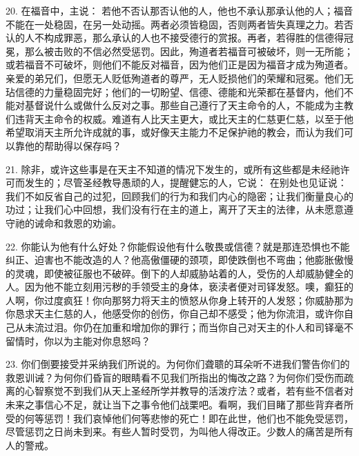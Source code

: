 20. 在福音中，主说：  若他不否认那否认他的人，他也不承认那承认他的人；福音不能在一处稳固，在另一处动摇。两者必须皆稳固，否则两者皆失真理之力。若否认的人不构成罪恶，那么承认的人也不接受德行的赏报。再者，若得胜的信德得冠冕，那么被击败的不信必然受惩罚。因此，殉道者若福音可被破坏，则一无所能；或若福音不可破坏，则他们不能反对福音，因为他们正是因为福音才成为殉道者。亲爱的弟兄们，但愿无人贬低殉道者的尊严，无人贬损他们的荣耀和冠冕。他们无玷信德的力量稳固完好；他们的一切盼望、信德、德能和光荣都在基督内，他们不能对基督说什么或做什么反对之事。那些自己遵行了天主命令的人，不能成为主教们违背天主命令的权威。难道有人比天主更大，或比天主的仁慈更仁慈，以至于他希望取消天主所允许成就的事，或好像天主能力不足保护祂的教会，而认为我们可以靠他的帮助得以保存吗？\par

21. 除非，或许这些事是在天主不知道的情况下发生的，或所有这些都是未经祂许可而发生的；尽管圣经教导愚顽的人，提醒健忘的人，它说：  在别处也见证说：  我们不如反省自己的过犯，回顾我们的行为和我们内心的隐密；让我们衡量良心的功过；让我们心中回想，我们没有行在主的道上，离开了天主的法律，从未愿意遵守祂的诫命和救恩的劝谕。\par

22. 你能认为他有什么好处？你能假设他有什么敬畏或信德？就是那连恐惧也不能纠正、迫害也不能改造的人？他高傲僵硬的颈项，即使跌倒也不弯曲；他膨胀傲慢的灵魂，即使被征服也不破碎。倒下的人却威胁站着的人，受伤的人却威胁健全的人。因为他不能立刻用污秽的手领受主的身体，亵渎者便对司铎发怒。噢，癫狂的人啊，你过度疯狂！你向那努力将天主的愤怒从你身上转开的人发怒；你威胁那为你恳求天主仁慈的人，他感受你的创伤，你自己却不感受；他为你流泪，或许你自己从未流过泪。你仍在加重和增加你的罪行；而当你自己对天主的仆人和司铎毫不留情时，你以为主能对你息怒吗？\par

23. 你们倒要接受并采纳我们所说的。为何你们聋聩的耳朵听不进我们警告你们的救恩训诫？为何你们昏盲的眼睛看不见我们所指出的悔改之路？为何你们受伤而疏离的心智察觉不到我们从天上圣经所学并教导的活泼疗法？或者，若有些不信者对未来之事信心不足，就让当下之事令他们战栗吧。看啊，我们目睹了那些背弃者所受的何等惩罚！我们哀悼他们何等悲惨的死亡！即在此世，他们也不能免受惩罚，尽管惩罚之日尚未到来。有些人暂时受罚，为叫他人得改正。少数人的痛苦是所有人的警戒。\par

